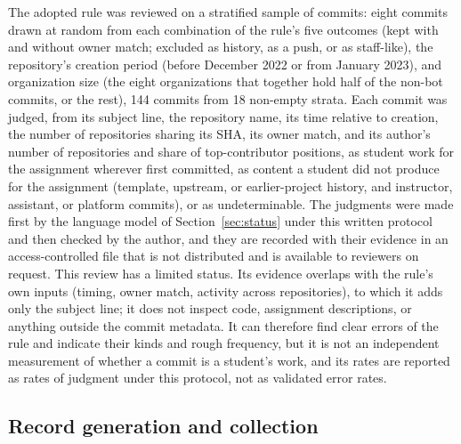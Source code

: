 \documentclass[acmsmall,screen,review,anonymous]{acmart}
\begin{document}
The adopted rule was reviewed on a stratified sample of commits: eight commits drawn at random from each combination of the rule's five outcomes (kept with and without owner match; excluded as history, as a push, or as staff-like), the repository's creation period (before December 2022 or from January 2023), and organization size (the eight organizations that together hold half of the non-bot commits, or the rest), 144 commits from 18 non-empty strata. Each commit was judged, from its subject line, the repository name, its time relative to creation, the number of repositories sharing its SHA, its owner match, and its author's number of repositories and share of top-contributor positions, as student work for the assignment wherever first committed, as content a student did not produce for the assignment (template, upstream, or earlier-project history, and instructor, assistant, or platform commits), or as undeterminable. The judgments were made first by the language model of Section~\ref{sec:status} under this written protocol and then checked by the author, and they are recorded with their evidence in an access-controlled file that is not distributed and is available to reviewers on request. This review has a limited status. Its evidence overlaps with the rule's own inputs (timing, owner match, activity across repositories), to which it adds only the subject line; it does not inspect code, assignment descriptions, or anything outside the commit metadata. It can therefore find clear errors of the rule and indicate their kinds and rough frequency, but it is not an independent measurement of whether a commit is a student's work, and its rates are reported as rates of judgment under this protocol, not as validated error rates.

\subsection{Record generation and collection}
\label{sec:recordmethod}
\end{document}
